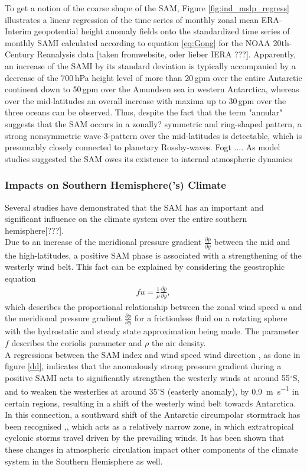 To get a notion of the coarse shape of the SAM, Figure \ref{fig:ind_mslp_regress} illustrates a linear regression of the time series of monthly zonal mean ERA-Interim geopotential height anomaly fields onto the standardized  time  series of monthly SAMI calculated according to equation \ref{eq:Gong} for the NOAA 20th-Century Reanalysis data [taken fromwebsite, oder lieber IERA ???]. Apparently, an increase of the SAMI by its standard deviation is typically accompanied by a decrease of the 700\,hPa height level of more than 20\,gpm over the entire Antarctic continent down to 50\,gpm over the Amundsen sea in western Antarctica, whereas over the mid-latitudes an overall increase with maxima up to 30\,gpm over the three oceans can be observed. Thus, despite the fact that the term "annular"  suggests that the SAM occurs in a zonally? symmetric and ring-shaped pattern, a strong nonsymmetric wave-3-pattern over the mid-latitudes is detectable, which is presumably closely connected to planetary Rossby-waves.  Fogt ....
As model studies suggested the SAM owes its existence to internal atmospheric dynamics



	
\subsubsection{Impacts on Southern Hemisphere('s) Climate}
Several studies have demonstrated that the SAM has an important and significant influence on the climate system over the entire southern hemisphere[???].\\
 Due to an increase of the meridional pressure gradient  $\frac{\partial p}{\partial y}$ between the mid and the high-latitudes, a positive SAM phase is associated with a strengthening of the westerly wind belt. This fact can be explained by considering the geostrophic equation
\begin{align*}
	fu=\frac{1}{\rho}\frac{\partial p}{\partial y},
\end{align*}
which describes the proportional relationship between the zonal wind speed $u$ and the meridional pressure gradient $\frac{\partial p}{\partial y}$ for a frictionless fluid on a rotating sphere with the hydrostatic and steady state approximation being made. The parameter $f$ describes the coriolis parameter and $\rho$  the air density.\\
 A regressions  between the SAM index and wind speed wind direction \cite{Lovenduski2005}, as done in figure \ref{dd}, indicates that the anomalously strong pressure gradient during  a positive SAMI acts to significantly strengthen the westerly winds at around 55$^\circ$S, and to weaken the westerlies at around 35$^\circ$S (easterly anomaly), by \SI{0.9}{\metre\per\second} in certain regions, resulting in a shift of the westerly wind belt towards Antarctica. In this connection, a southward shift of the Antarctic circumpolar stormtrack has been recognised \cite{Thompson2000},\cite{Gillett2006}, which acts as a relatively narrow zone, in which extratropical cyclonic storms travel driven by the prevailing winds. It has been shown that these  changes in atmospheric circulation impact other components of the climate system in the Southern Hemisphere as well\cite{Hall2002}.\\
 
